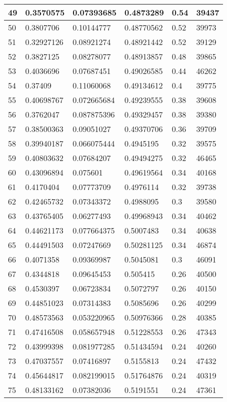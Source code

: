 \begin{longtable}{|l|l|l|l|l|l|}
49 & 0.3570575 & 0.07393685 & 0.4873289 & 0.54 & 39437 \\ \hline 
50 & 0.3807706 & 0.10144777 & 0.48770562 & 0.52 & 39973 \\ \hline 
51 & 0.32927126 & 0.08921274 & 0.48921442 & 0.52 & 39129 \\ \hline 
52 & 0.3827125 & 0.08278077 & 0.48913857 & 0.48 & 39865 \\ \hline 
53 & 0.4036696 & 0.07687451 & 0.49026585 & 0.44 & 46262 \\ \hline 
54 & 0.37409 & 0.11060068 & 0.49134612 & 0.4 & 39775 \\ \hline 
55 & 0.40698767 & 0.072665684 & 0.49239555 & 0.38 & 39608 \\ \hline 
56 & 0.3762047 & 0.087875396 & 0.49329457 & 0.38 & 39380 \\ \hline 
57 & 0.38500363 & 0.09051027 & 0.49370706 & 0.36 & 39709 \\ \hline 
58 & 0.39940187 & 0.066075444 & 0.4945195 & 0.32 & 39575 \\ \hline 
59 & 0.40803632 & 0.07684207 & 0.49494275 & 0.32 & 46465 \\ \hline 
60 & 0.43096894 & 0.075601 & 0.49619564 & 0.34 & 40168 \\ \hline 
61 & 0.4170404 & 0.07773709 & 0.4976114 & 0.32 & 39738 \\ \hline 
62 & 0.42465732 & 0.07343372 & 0.4988095 & 0.3 & 39580 \\ \hline 
63 & 0.43765405 & 0.06277493 & 0.49968943 & 0.34 & 40462 \\ \hline 
64 & 0.44621173 & 0.077664375 & 0.5007483 & 0.34 & 40638 \\ \hline 
65 & 0.44491503 & 0.07247669 & 0.50281125 & 0.34 & 46874 \\ \hline 
66 & 0.4071358 & 0.09369987 & 0.5045081 & 0.3 & 46091 \\ \hline 
67 & 0.4344818 & 0.09645453 & 0.505415 & 0.26 & 40500 \\ \hline 
68 & 0.4530397 & 0.06723834 & 0.5072797 & 0.26 & 40150 \\ \hline 
69 & 0.44851023 & 0.07314383 & 0.5085696 & 0.26 & 40299 \\ \hline 
70 & 0.48573563 & 0.053220965 & 0.50976366 & 0.28 & 40385 \\ \hline 
71 & 0.47416508 & 0.058657948 & 0.51228553 & 0.26 & 47343 \\ \hline 
72 & 0.43999398 & 0.081977285 & 0.51434594 & 0.24 & 40260 \\ \hline 
73 & 0.47037557 & 0.07416897 & 0.5155813 & 0.24 & 47432 \\ \hline 
74 & 0.45644817 & 0.082199015 & 0.51764876 & 0.24 & 40319 \\ \hline 
75 & 0.48133162 & 0.07382036 & 0.5191551 & 0.24 & 47361 \\ \hline 
\end{longtable}